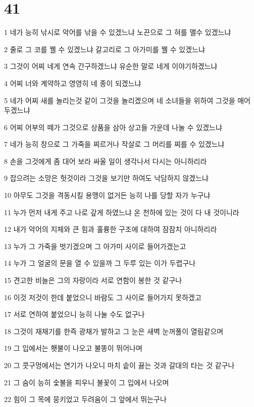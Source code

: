 \chapter{41}

\par 1 네가 능히 낚시로 악어를 낚을 수 있겠느냐 노끈으로 그 혀를 맬수 있겠느냐
\par 2 줄로 그 코를 꿸 수 있겠느냐 갈고리로 그 아가미를 꿸 수 있겠느냐
\par 3 그것이 어찌 네게 연속 간구하겠느냐 유순한 말로 네게 이야기하겠느냐
\par 4 어찌 너와 계약하고 영영히 네 종이 되겠느냐
\par 5 네가 어찌 새를 놀리는것 같이 그것을 놀리겠으며 네 소녀들을 위하여 그것을 매어 두겠느냐
\par 6 어찌 어부의 떼가 그것으로 상품을 삼아 상고들 가운데 나눌 수 있겠느냐
\par 7 네가 능히 창으로 그 가죽을 찌르거나 작살로 그 머리를 찌를 수 있겠느냐
\par 8 손을 그것에게 좀 대어 보라 싸울 일이 생각나서 다시는 아니하리라
\par 9 잡으려는 소망은 헛것이라 그것을 보기만 하여도 낙담하지 않겠느냐
\par 10 아무도 그것을 격동시킬 용맹이 없거든 능히 나를 당할 자가 누구냐
\par 11 누가 먼저 내게 주고 나로 갚게 하였느냐 온 천하에 있는 것이 다 내 것이니라
\par 12 내가 악어의 지체와 큰 힘과 훌륭한 구조에 대하여 잠잠치 아니하리라
\par 13 누가 그 가죽을 벗기겠으며 그 아가미 사이로 들어가겠는고
\par 14 누가 그 얼굴의 문을 열 수 있을까 그 두루 있는 이가 두렵구나
\par 15 견고한 비늘은 그의 자랑이라 서로 연함이 봉한 것 같구나
\par 16 이것 저것이 한데 붙었으니 바람도 그 사이로 들어가지 못하겠고
\par 17 서로 연하여 붙었으니 능히 나눌 수도 없구나
\par 18 그것이 재채기를 한즉 광채가 발하고 그 눈은 새벽 눈꺼풀이 열림같으며
\par 19 그 입에서는 횃불이 나오고 불똥이 뛰어나며
\par 20 그 콧구멍에서는 연기가 나오니 마치 솥이 끓는 것과 갈대의 타는 것 같구나
\par 21 그 숨이 능히 숯불을 피우니 불꽃이 그 입에서 나오며
\par 22 힘이 그 목에 뭉키었고 두려움이 그 앞에서 뛰는구나
